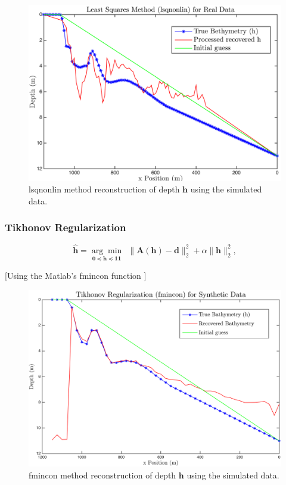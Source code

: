 \begin{figure}[H]
\center
\includegraphics[scale=0.6]{img/lsqnonlin_real_data_oct09.png} %
\caption{lsqnonlin method reconstruction of depth $\mathbf{h}$ using the simulated data.}
\label{fmincon_simulated}
\end{figure}

\subsubsection{Tikhonov Regularization}

\begin{equation}\label{LS-regBC}
\mathbf{\hat{h}} = \underset{\mathbf{0} \preceq \mathbf{h} \preceq \mathbf{11}}{\arg \min} \ \ \|  \mathbf{A}(\mathbf{h}) -  \mathbf{d} \|_2^2  +  \alpha \| \mathbf{h}\|_2^2,
\end{equation}

[Using the Matlab's fmincon function ]


\begin{figure}[H]
\center
\includegraphics[scale=0.46]{img/fmincon_simulated_25m.png} %
\caption{fmincon method reconstruction of depth $\mathbf{h}$ using the simulated data.}
\label{fmincon_simulated}
\end{figure}

